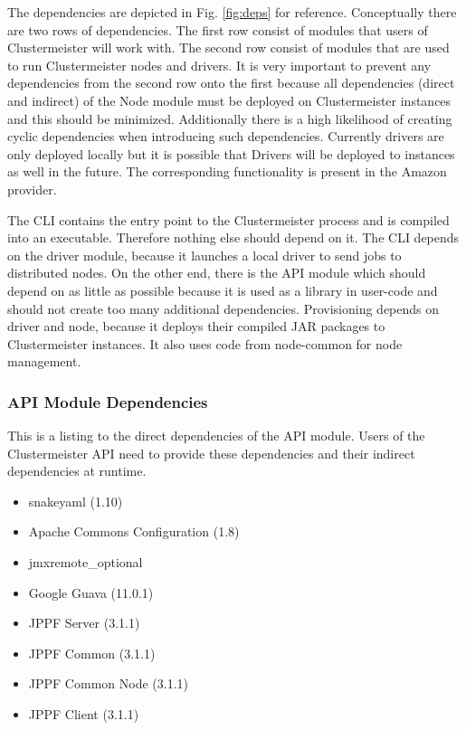 \documentclass[12pt]{article}
\begin{document}
The dependencies are depicted in Fig. \ref{fig:deps} for reference. Conceptually there are two rows of dependencies. The first row consist of modules that users of Clustermeister will work with. The second row consist of modules that are used to run Clustermeister nodes and drivers. It is very important to prevent any dependencies from the second row onto the first because all dependencies (direct and indirect) of the Node module must be deployed on Clustermeister instances and this should be minimized. Additionally there is a high likelihood of creating cyclic dependencies when introducing such dependencies. Currently drivers are only deployed locally but it is possible that Drivers will be deployed to instances as well in the future. The corresponding functionality is present in the Amazon provider. 

The CLI contains the entry point to the Clustermeister process and is compiled into an executable. Therefore nothing else should depend on it. The CLI depends on the driver module, because it launches a local driver to send jobs to distributed nodes. On the other end, there is the API module which should depend on as little as possible because it is used as a library in user-code and should not create too many additional dependencies. Provisioning depends on driver and node, because it deploys their compiled JAR packages to Clustermeister instances. It also uses code from node-common for node management.

\subsubsection{API Module Dependencies}
This is a listing to the direct dependencies of the API module. Users of the Clustermeister API need to provide these dependencies and their indirect dependencies at runtime.

\begin{itemize}
 \item snakeyaml (1.10)
 \item Apache Commons Configuration (1.8)
 \item jmxremote\_optional
 \item Google Guava (11.0.1)
 \item JPPF Server (3.1.1)
 \item JPPF Common (3.1.1)
 \item JPPF Common Node (3.1.1)
 \item JPPF Client (3.1.1)
\end{itemize} 
\end{document}
